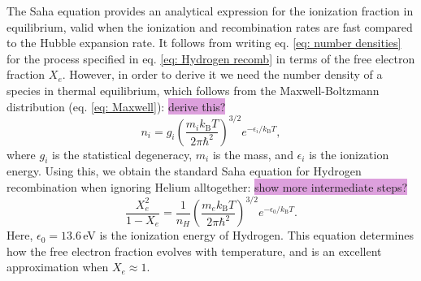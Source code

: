 \documentclass{aa}
\numberwithin{equation}{section}
\numberwithin{table}{section}
\numberwithin{figure}{section}
\begin{document}

The Saha equation provides an analytical expression for the ionization fraction in equilibrium, valid when the ionization and recombination rates are fast compared to the Hubble expansion rate. It follows from writing eq. \eqref{eq: number densities} for the process specified in eq. \eqref{eq: Hydrogen recomb} in terms of the free electron fraction $X_e$. However, in order to derive it we need the number density of a species in thermal equilibrium, which follows from the Maxwell-Boltzmann distribution (eq. \eqref{eq: Maxwell}): \colorbox{Plum}{derive this?}
\begin{equation}
n_i = g_i \left( \frac{m_i k_\text{B} T}{2\pi \hbar^2} \right)^{3/2} e^{-\epsilon_i / k_\text{B} T},
\end{equation}
where $g_i$ is the statistical degeneracy, $m_i$ is the mass, and $\epsilon_i$ is the ionization energy. Using this, we obtain the standard Saha equation for Hydrogen recombination when ignoring Helium alltogether: \colorbox{Plum}{show more intermediate steps?}
\begin{equation}
\frac{X_e^2}{1 - X_e} = \frac{1}{n_H} \left( \frac{m_e k_\text{B} T}{2\pi \hbar^2} \right)^{3/2} e^{-\epsilon_0 / k_\text{B} T}. \label{eq: Saha}
\end{equation}
Here, $\epsilon_0 = 13.6\,$eV is the ionization energy of Hydrogen. This equation determines how the free electron fraction evolves with temperature, and is an excellent approximation when $X_e\approx1$.
\end{document}
